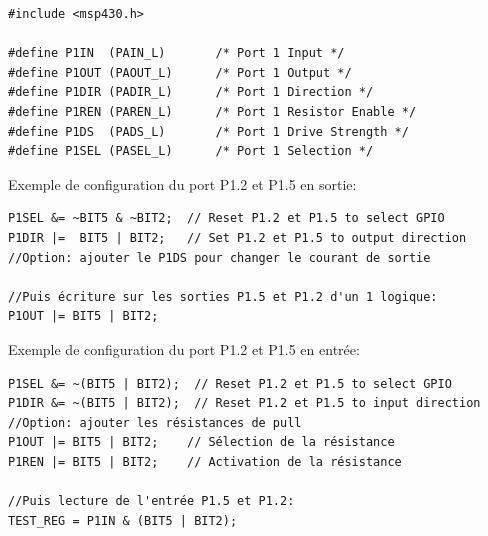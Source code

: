 \lstset{style=customc}
\begin{lstlisting}
#include <msp430.h>

#define P1IN  (PAIN_L)       /* Port 1 Input */
#define P1OUT (PAOUT_L)      /* Port 1 Output */
#define P1DIR (PADIR_L)      /* Port 1 Direction */
#define P1REN (PAREN_L)      /* Port 1 Resistor Enable */
#define P1DS  (PADS_L)       /* Port 1 Drive Strength */
#define P1SEL (PASEL_L)      /* Port 1 Selection */
\end{lstlisting}

Exemple de configuration du port P1.2 et P1.5 en sortie:

\lstset{style=customc}
\begin{lstlisting}
P1SEL &= ~BIT5 & ~BIT2;  // Reset P1.2 et P1.5 to select GPIO
P1DIR |=  BIT5 | BIT2;   // Set P1.2 et P1.5 to output direction
//Option: ajouter le P1DS pour changer le courant de sortie

//Puis écriture sur les sorties P1.5 et P1.2 d'un 1 logique:
P1OUT |= BIT5 | BIT2;
\end{lstlisting}

Exemple de configuration du port P1.2 et P1.5 en entrée:

\lstset{style=customc}
\begin{lstlisting}
P1SEL &= ~(BIT5 | BIT2);  // Reset P1.2 et P1.5 to select GPIO
P1DIR &= ~(BIT5 | BIT2);  // Reset P1.2 et P1.5 to input direction
//Option: ajouter les résistances de pull
P1OUT |= BIT5 | BIT2;    // Sélection de la résistance
P1REN |= BIT5 | BIT2;    // Activation de la résistance

//Puis lecture de l'entrée P1.5 et P1.2:
TEST_REG = P1IN & (BIT5 | BIT2);
\end{lstlisting}

